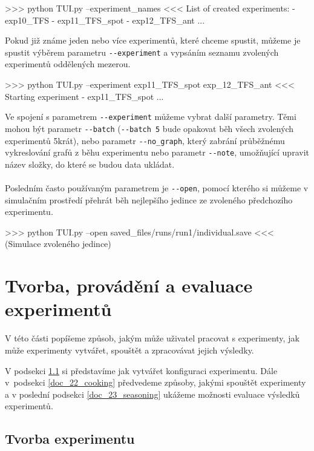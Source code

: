 \begin{code}
>>> python TUI.py --experiment_names
<<< List of created experiments:
     - exp10_TFS
     - exp11_TFS_spot
     - exp12_TFS_ant
     ...
\end{code}

Pokud již známe jeden nebo více experimentů, které chceme spustit,
můžeme je spustit výběrem parametru \texttt{-{}-experiment} a vypsáním seznamu 
zvolených experimentů oddělených mezerou.

\begin{code}
>>> python TUI.py --experiment exp11_TFS_spot exp_12_TFS_ant
<<< Starting experiment - exp11_TFS_spot 
    ...
\end{code}

Ve spojení s parametrem \texttt{-{}-experiment} můžeme vybrat další parametry.
Těmi mohou být parametr \texttt{-{}-batch} (\texttt{-{}-batch 5} bude
opakovat běh všech zvolených experimentů 5krát), nebo parametr
\texttt{-{}-no\_graph}, který zabrání průběžnému vykreslování grafů z běhu
experimentu nebo parametr \texttt{-{}-note}, umožňující upravit název složky,
do které se budou data ukládat.

\paragraph{}
Posledním často používaným parametrem je \texttt{-{}-open}, pomocí kterého
si můžeme v simulačním prostředí přehrát běh nejlepšího jedince ze zvoleného
předchozího experimentu.
\begin{code}
>>> python TUI.py --open saved_files/runs/run1/individual.save
<<< (Simulace zvoleného jedince)
\end{code}

\section{Tvorba, provádění a evaluace experimentů} \label{doc_2_experimenty}

V této části popíšeme způsob, jakým může uživatel pracovat s experimenty, jak
může experimenty vytvářet, spouštět a zpracovávat jejich výsledky.

V podsekci \ref{doc_21_mise_en_place} si představíme jak vytvářet
konfiguraci experimentu. Dále v~podsekci \ref{doc_22_cooking} předvedeme
způsoby, jakými spouštět experimenty a v poslední podsekci
\ref{doc_23_seasoning} ukážeme možnosti evaluace výsledků experimentů.

\subsection{Tvorba experimentu} \label{doc_21_mise_en_place}


